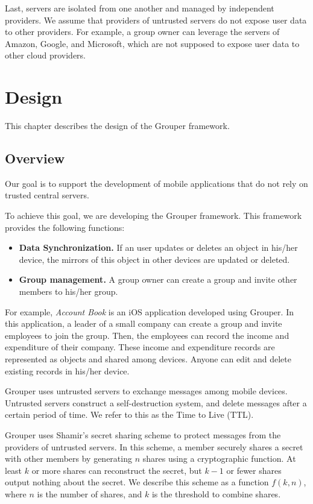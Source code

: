 \documentclass[a4paper,11pt]{report}
\begin{document}
Last, servers are isolated from one another and managed by independent providers.
We assume that providers of untrusted servers do not expose user data to other providers.
For example, a group owner can leverage the servers of Amazon, Google, and Microsoft, which are not supposed to expose user data to other cloud providers.

\chapter{Design} \label{chapter:design}

This chapter describes the design of the Grouper framework.

\section{Overview} \label{section:overview}

Our goal is to support the development of mobile applications that do not rely on trusted central servers.

To achieve this goal, we are developing the Grouper framework.
This framework provides the following functions:

\begin{itemize}[leftmargin=7mm]
	\setlength{\itemsep}{1pt}
	\setlength{\parskip}{0pt}
	\setlength{\parsep}{0pt}
	\item \textbf{Data Synchronization.} 
	If an user updates or deletes an object in his/her device, the mirrors of this object in other devices are updated or deleted.
	\item \textbf{Group management.} 
	A group owner can create a group and invite other members to his/her group.
\end{itemize}

For example, \emph{Account Book} is an iOS application developed using Grouper. 
In this application, a leader of a small company can create a group and invite employees to join the group. 
Then, the employees can record the income and expenditure of their company.
These income and expenditure records are represented as objects and shared among devices.
Anyone can edit and delete existing records in his/her device.

Grouper uses untrusted servers to exchange messages among mobile devices.
Untrusted servers construct a self-destruction system, and delete messages after a certain period of time.
We refer to this as the Time to Live (TTL).

Grouper uses Shamir's secret sharing scheme to protect messages from the providers of untrusted servers.
In this scheme, a member securely shares a secret with other members by generating $n$ shares using a cryptographic function\cite{smith2013layered}. 
At least $k$ or more shares can reconstruct the secret, but $k-1$ or fewer shares output nothing about the secret\cite{pang2005new}. 
We describe this scheme as a function ${f(k, n)}$, where $n$ is the number of shares, and $k$ is the threshold to combine shares. 
\end{document}

